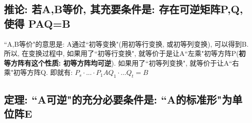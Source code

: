 \documentclass[UTF8]{ctexart}
\begin{document}
\subsection{推论: 若A,B等价, 其充要条件是:  存在可逆矩阵P,Q, 使得 PAQ=B }

``A,B等价"的意思是: A通过``初等变换"(用初等行变换, 或初等列变换), 可以得到B. \\

所以, 在变换过程中, 如果用了``初等行变换", 就等价于是让A``左乘"初等方阵P(\textbf{初等方阵有这个性质: 初等方阵均可逆}). 如果用了``初等列变换", 就等价于让A``右乘"初等方阵Q. 即就有: $	P_s\cdot ...\cdot P_1AQ_1\cdot ...Q_t = B$\\



\subsection{定理: ``A可逆"的充分必要条件是: ``A的标准形"为单位阵E}
\end{document}
